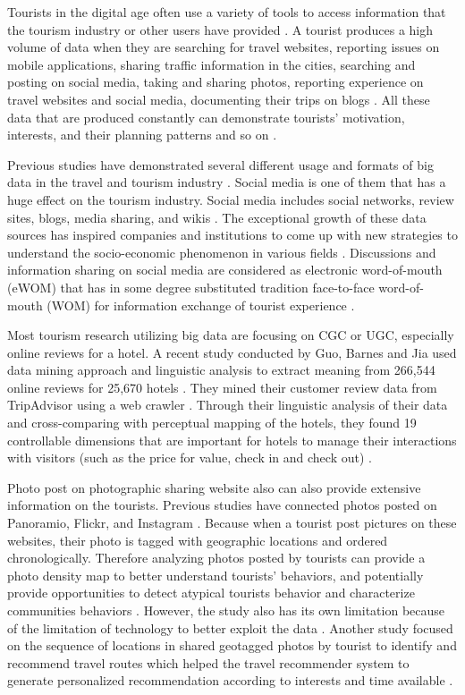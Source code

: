 Tourists in the digital age often use a variety of tools to access information that
the tourism industry or other users have provided \cite{XIANG2015120}. A tourist
produces a high volume of data when they are searching for travel websites, reporting
issues on mobile applications, sharing traffic information in the cities, searching and
posting on social media, taking and sharing photos, reporting experience on travel
websites and social media, documenting their trips on blogs \cite{akerkar2012, Shafiee16}. 
All these data that are produced constantly can demonstrate tourists' motivation, 
interests, and their planning patterns and so on \cite{XIE2017101}.

Previous studies have demonstrated several different usage and formats of big data in
the travel and tourism industry \cite{XIE2017101}. Social media is one of them that
has a huge effect on the tourism industry. Social media includes social networks,
review sites, blogs, media sharing, and wikis \cite{XIANG2015120}. The exceptional
growth of these data sources has inspired companies and institutions to come up with 
new strategies to understand the socio-economic phenomenon in various
fields \cite{Shafiee16}. Discussions and information sharing on social media are
considered as electronic word-of-mouth (eWOM) that has in some degree substituted
tradition face-to-face word-of-mouth (WOM) for information exchange of tourist
experience \cite{chung2009}. 

Most tourism research utilizing big data are focusing on CGC or UGC, especially
online reviews for a hotel. A recent study conducted by Guo, Barnes and Jia used data
mining approach and linguistic analysis to extract meaning from 266,544 online reviews
for 25,670 hotels \cite{GUO2017467}. They mined their customer review data from TripAdvisor
using a web crawler \cite{GUO2017467}. Through their linguistic analysis of their data 
and cross-comparing with perceptual mapping of the hotels, they found 19 controllable
dimensions that are important for hotels to manage their interactions with visitors
(such as the price for value, check in and check out) \cite{GUO2017467}.

Photo post on photographic sharing website also can also provide extensive information
on the tourists. Previous studies have connected photos posted on Panoramio, Flickr,
and Instagram \cite{GJT14, MIAH2017}. Because when a tourist post pictures on these
websites, their photo is tagged with geographic locations and ordered chronologically.
Therefore analyzing photos posted by tourists can provide a photo density map to
better understand tourists' behaviors, and potentially provide opportunities to detect
atypical tourists behavior and characterize communities behaviors \cite{MIAH2017}. However, the study
also has its own limitation because of the limitation of technology to better exploit
the data \cite{GJT14}. Another study focused on the sequence of locations in shared
geotagged photos by tourist to identify and recommend travel routes which helped the
travel recommender system to generate personalized recommendation according to
interests and time available \cite{MIAH2017}. 

